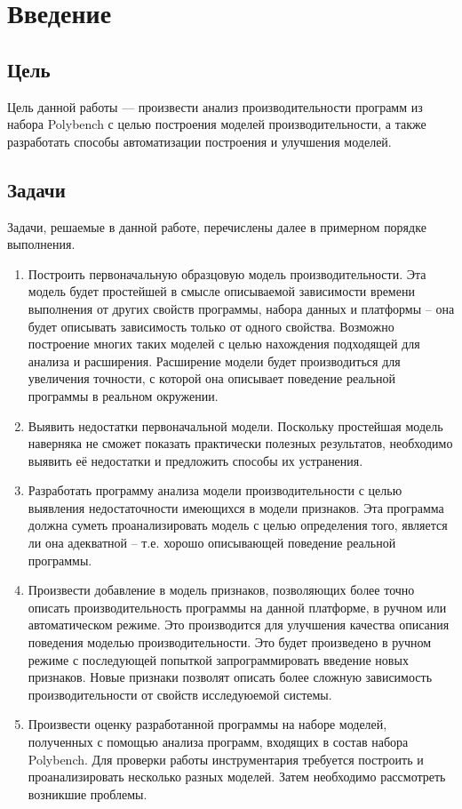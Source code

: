 \section{Введение}
\subsection{Цель}

Цель данной работы --- произвести анализ производительности программ из набора Polybench с целью построения моделей производительности, а также разработать способы автоматизации построения и улучшения моделей.

\subsection{Задачи}
Задачи, решаемые в данной работе, перечислены далее в примерном порядке выполнения.
\begin{enumerate}
	\item Построить первоначальную образцовую модель производительности. Эта модель будет простейшей в смысле описываемой зависимости времени выполнения от других свойств программы, набора данных и платформы -- она будет описывать зависимость только от одного свойства. Возможно построение многих таких моделей с целью нахождения подходящей для анализа и расширения. Расширение модели будет производиться для увеличения точности, с которой она описывает поведение реальной программы в реальном окружении.
	\item Выявить недостатки первоначальной модели. Поскольку простейшая модель наверняка не сможет показать практически полезных результатов, необходимо выявить её недостатки и предложить способы их устранения.
	\item Разработать программу анализа модели производительности с целью выявления недостаточности имеющихся в модели признаков. Эта программа должна суметь проанализировать модель с целью определения того, является ли она адекватной -- т.е. хорошо описывающей поведение реальной программы.
	\item Произвести добавление в модель признаков, позволяющих более точно описать производительность программы на данной платформе, в ручном или автоматическом режиме. Это производится для улучшения качества описания поведения моделью производительности. Это будет произведено в ручном режиме с последующей попыткой запрограммировать введение новых признаков. Новые признаки позволят описать более сложную зависимость производительности от свойств исследуюемой системы.
	\item Произвести оценку разработанной программы на наборе моделей, полученных с помощью анализа программ, входящих в состав набора Polybench. Для проверки работы инструментария требуется построить и проанализировать несколько разных моделей. Затем необходимо рассмотреть возникшие проблемы.
\end{enumerate}